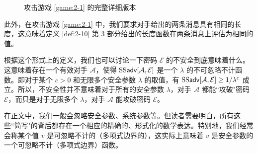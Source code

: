 \begin{figure}
	\centering
	
	\caption{攻击游戏 \ref{game:2-1} 的完整详细版本}
	\label{fig:2-6}
\end{figure}

此外，在攻击游戏 \ref{game:2-1} 中，我们要求对手给出的两条消息具有相同的长度，这意味着定义 \ref{def:2-10} 第 3 部分给出的长度函数在两条消息上评估为相同的值。

根据这个形式上的定义，我们也可以讨论一下密码 $\mathcal{E}$ 的不安全到底意味着什么。这意味着存在一个有效对手 $\mathcal{A}$，使得 ${\rm SS\mathsf{adv}}[\mathcal{A},\mathcal{E}]$ 是一个 $\lambda$ 的不可忽略不计函数。即对于某个 $c>0$ 和无限多个安全参数 $\lambda$ 的取值，有 ${\rm SS\mathsf{adv}}[\mathcal{A},\mathcal{E}]\geq{1}/{\lambda^c}$ 成立。所以，不安全性并不意味着对于所有的安全参数 $\lambda$，对手 $\mathcal{A}$ 都能``攻破"密码 $\mathcal{E}$，而只是对于无限多个 $\lambda$，对手 $\mathcal{A}$ 能攻破密码 $\mathcal{E}$。

在正文中，我们一般会忽略安全参数、系统参数等。但读者需要明白，所有这些``简写"的背后都存在一个相应的精确的、形式化的数学表达。特别地，我们经常会称某个值 $v$ 是可忽略不计的（多项式边界的），这实际上意味着 $v$ 是安全参数的一个可忽略不计（多项式边界）函数。